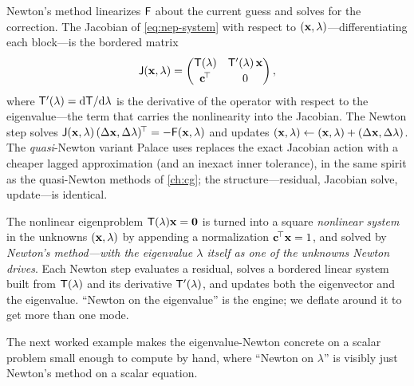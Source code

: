 Newton's method linearizes $\mathsf{F}$ about the current guess and solves for the
correction. The Jacobian of \cref{eq:nep-system} with respect to
$(\mathbf{x},\lambda)$---differentiating each block---is the bordered matrix
\begin{equation}
  \mathsf{J}(\mathbf{x},\lambda) =
  \begin{pmatrix}
    \mathsf{T}(\lambda) & \mathsf{T}'(\lambda)\,\mathbf{x} \\[2pt]
    \mathbf{c}^{\!\top} & 0
  \end{pmatrix},
  \label{eq:nep-jacobian}
\end{equation}
where $\mathsf{T}'(\lambda)=\mathrm{d}\mathsf{T}/\mathrm{d}\lambda$ is the derivative of
the operator with respect to the eigenvalue---the term that carries the
nonlinearity into the Jacobian. The Newton step solves
$\mathsf{J}(\mathbf{x},\lambda)\,(\Delta\mathbf{x},\Delta\lambda)^{\!\top}=-\mathsf{F}(\mathbf{x},\lambda)$
and updates $(\mathbf{x},\lambda)\leftarrow(\mathbf{x},\lambda)+(\Delta\mathbf{x},\Delta\lambda)$. The
\emph{quasi}-Newton variant Palace uses replaces the exact Jacobian action with a
cheaper lagged approximation (and an inexact inner tolerance), in the same spirit
as the quasi-Newton methods of \cref{ch:cg}; the structure---residual, Jacobian
solve, update---is identical.

\begin{keyidea}
The nonlinear eigenproblem $\mathsf{T}(\lambda)\mathbf{x}=\mathbf 0$ is turned into a square
\emph{nonlinear system} in the unknowns $(\mathbf{x},\lambda)$ by appending a
normalization $\mathbf{c}^{\!\top}\mathbf{x}=1$, and solved by \emph{Newton's method---with the
eigenvalue $\lambda$ itself as one of the unknowns Newton drives}. Each Newton
step evaluates a residual, solves a bordered linear system built from
$\mathsf{T}(\lambda)$ and its derivative $\mathsf{T}'(\lambda)$, and updates both the
eigenvector and the eigenvalue. ``Newton on the eigenvalue'' is the engine; we
deflate around it to get more than one mode.
\end{keyidea}

The next worked example makes the eigenvalue-Newton concrete on a scalar problem
small enough to compute by hand, where ``Newton on $\lambda$'' is visibly just
Newton's method on a scalar equation.

